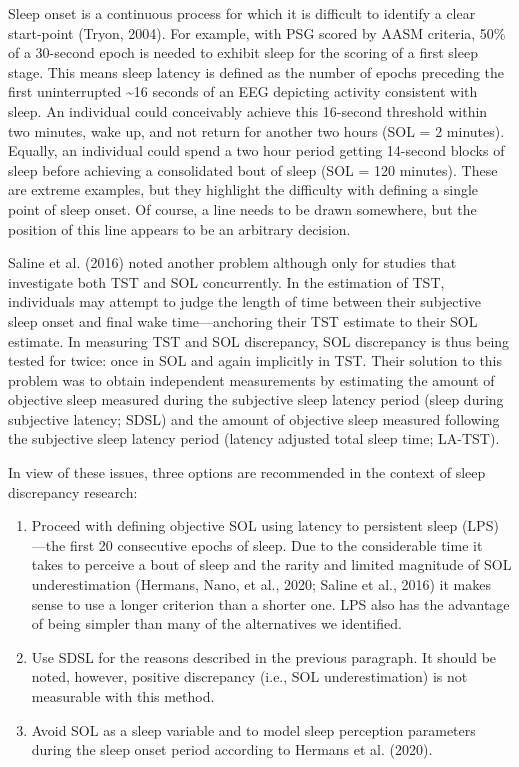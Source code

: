 \documentclass[
]{article}
\providecommand{\tightlist}{%
  \setlength{\itemsep}{0pt}\setlength{\parskip}{0pt}}
\begin{document}
Sleep onset is a continuous process for which it is difficult to identify a clear start-point (Tryon, 2004). For example, with PSG scored by AASM criteria, 50\% of a 30-second epoch is needed to exhibit sleep for the scoring of a first sleep stage. This means sleep latency is defined as the number of epochs preceding the first uninterrupted \textasciitilde16 seconds of an EEG depicting activity consistent with sleep. An individual could conceivably achieve this 16-second threshold within two minutes, wake up, and not return for another two hours (SOL = 2 minutes). Equally, an individual could spend a two hour period getting 14-second blocks of sleep before achieving a consolidated bout of sleep (SOL = 120 minutes). These are extreme examples, but they highlight the difficulty with defining a single point of sleep onset. Of course, a line needs to be drawn somewhere, but the position of this line appears to be an arbitrary decision.

Saline et al. (2016) noted another problem although only for studies that investigate both TST and SOL concurrently. In the estimation of TST, individuals may attempt to judge the length of time between their subjective sleep onset and final wake time---anchoring their TST estimate to their SOL estimate. In measuring TST and SOL discrepancy, SOL discrepancy is thus being tested for twice: once in SOL and again implicitly in TST. Their solution to this problem was to obtain independent measurements by estimating the amount of objective sleep measured during the subjective sleep latency period (sleep during subjective latency; SDSL) and the amount of objective sleep measured following the subjective sleep latency period (latency adjusted total sleep time; LA-TST).

In view of these issues, three options are recommended in the context of sleep discrepancy research:

\begin{enumerate}
\def\labelenumi{\arabic{enumi}.}
\tightlist
\item
  Proceed with defining objective SOL using latency to persistent sleep (LPS)---the first 20 consecutive epochs of sleep. Due to the considerable time it takes to perceive a bout of sleep and the rarity and limited magnitude of SOL underestimation (Hermans, Nano, et al., 2020; Saline et al., 2016) it makes sense to use a longer criterion than a shorter one. LPS also has the advantage of being simpler than many of the alternatives we identified.
\item
  Use SDSL for the reasons described in the previous paragraph. It should be noted, however, positive discrepancy (i.e., SOL underestimation) is not measurable with this method.
\item
  Avoid SOL as a sleep variable and to model sleep perception parameters during the sleep onset period according to Hermans et al. (2020).
\end{enumerate}
\end{document}
